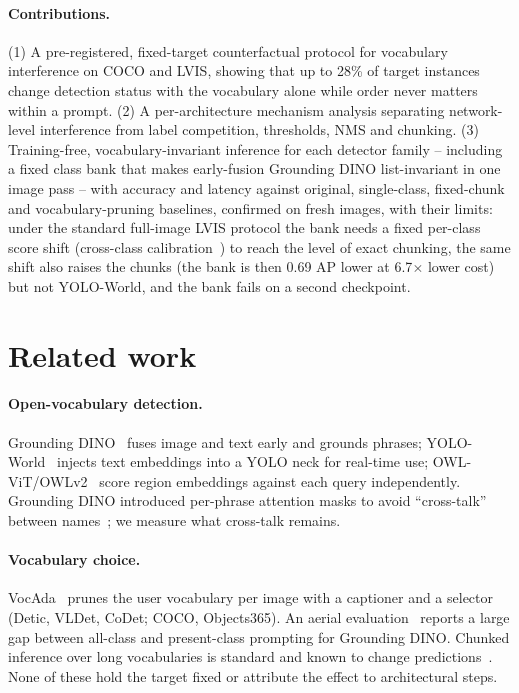 \documentclass[10pt,twocolumn,letterpaper]{article}
\begin{document}
\paragraph{Contributions.}
(1) A pre-registered, fixed-target counterfactual protocol for vocabulary interference on COCO and LVIS, showing that up
to 28\% of target instances change detection status with the vocabulary alone while order never matters within a prompt.
(2) A per-architecture mechanism analysis separating network-level interference from label competition, thresholds,
NMS and chunking.
(3) Training-free, vocabulary-invariant inference for each detector family -- including a fixed class bank that makes
early-fusion Grounding DINO list-invariant in one image pass -- with accuracy and latency against original, single-class,
fixed-chunk and vocabulary-pruning baselines, confirmed on fresh images, with their limits: under the standard full-image
LVIS protocol the bank needs a fixed per-class score shift (cross-class calibration~\cite{devil}) to reach the level of exact chunking, the same shift also raises the
chunks (the bank is then 0.69 AP lower at 6.7$\times$ lower cost) but not YOLO-World, and the bank fails on a second checkpoint.

\section{Related work}
\paragraph{Open-vocabulary detection.} Grounding DINO~\cite{gdino} fuses image and text early and grounds phrases;
YOLO-World~\cite{yoloworld} injects text embeddings into a YOLO neck for real-time use; OWL-ViT/OWLv2~\cite{owlvit,owlv2}
score region embeddings against each query independently. Grounding DINO introduced per-phrase attention masks to avoid
``cross-talk'' between names~\cite{gdino}; we measure what cross-talk remains.
\paragraph{Vocabulary choice.} VocAda~\cite{vocada} prunes the user vocabulary per image with a captioner and a selector
(Detic, VLDet, CoDet; COCO, Objects365). An aerial evaluation~\cite{aerial} reports a large gap between all-class and
present-class prompting for Grounding DINO. Chunked inference over long vocabularies is standard and known to change
predictions~\cite{mmgdino,slground}. None of these hold the target fixed or attribute the effect to architectural steps.
\end{document}
